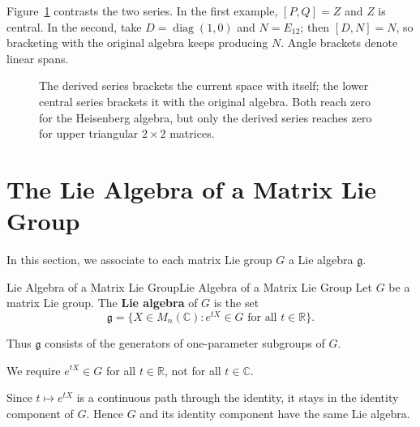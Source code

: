 \documentclass[../main.tex]{subfiles}
\begin{document}
Figure~\ref{fig:derived-and-lower-central-series} contrasts the two series. In the first example, $[P,Q]=Z$ and $Z$ is central. In the second, take $D=\operatorname{diag}(1,0)$ and $N=E_{12}$; then $[D,N]=N$, so bracketing with the original algebra keeps producing $N$. Angle brackets denote linear spans.

\begin{figure}[H]
    \centering
    \caption{The derived series brackets the current space with itself; the lower central series brackets it with the original algebra. Both reach zero for the Heisenberg algebra, but only the derived series reaches zero for upper triangular $2\times2$ matrices.}
    \label{fig:derived-and-lower-central-series}
\end{figure}

\section{The Lie Algebra of a Matrix Lie Group}
In this section, we associate to each matrix Lie group $G$ a Lie algebra $\mathfrak{g}$.

\begin{definition}{Lie Algebra of a Matrix Lie Group}{Lie Algebra of a Matrix Lie Group}
  Let $G$ be a matrix Lie group. The \textbf{Lie algebra} of $G$ is the set
  \begin{equation}
    \mathfrak{g} = \{X \in M_n(\mathbb{C}) : e^{tX} \in G \text{ for all } t \in \mathbb{R}\}.
  \end{equation}
\end{definition}
Thus $\mathfrak{g}$ consists of the generators of one-parameter subgroups of $G$.

\begin{remark}
  We require $e^{tX} \in G$ for all $t \in \mathbb{R}$, not for all $t \in \mathbb{C}$.
\end{remark}

Since $t\mapsto e^{tX}$ is a continuous path through the identity, it stays in the identity component of $G$. Hence $G$ and its identity component have the same Lie algebra.
\end{document}

